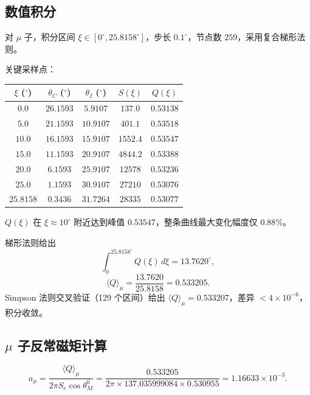 \documentclass[12pt,a4paper]{article}
\theoremstyle{definition}
\begin{document}
\subsection{数值积分}

对 $\mu$ 子，积分区间 $\xi\in[0^\circ,25.8158^\circ]$，步长 $0.1^\circ$，节点数 $259$，采用复合梯形法则。

关键采样点：

\begin{center}
\begin{tabular}{@{}ccccc@{}}
\toprule
$\xi$ ($^\circ$) & $\theta_C$ ($^\circ$) & $\theta_I$ ($^\circ$) & $S(\xi)$ & $Q(\xi)$ \\
\midrule
$0.0$ & $26.1593$ & $5.9107$ & $137.0$ & $0.53138$ \\
$5.0$ & $21.1593$ & $10.9107$ & $401.1$ & $0.53518$ \\
$10.0$ & $16.1593$ & $15.9107$ & $1552.4$ & $0.53547$ \\
$15.0$ & $11.1593$ & $20.9107$ & $4844.2$ & $0.53388$ \\
$20.0$ & $6.1593$ & $25.9107$ & $12578$ & $0.53236$ \\
$25.0$ & $1.1593$ & $30.9107$ & $27210$ & $0.53076$ \\
$25.8158$ & $0.3436$ & $31.7264$ & $28335$ & $0.53077$ \\
\bottomrule
\end{tabular}
\end{center}

$Q(\xi)$ 在 $\xi\approx10^\circ$ 附近达到峰值 $0.53547$，整条曲线最大变化幅度仅 $0.88\%$。

梯形法则给出
\begin{equation}
\int_0^{25.8158^\circ}Q(\xi)\,d\xi=13.7620^\circ,
\end{equation}
\begin{equation}
\boxed{\langle Q\rangle_\mu=\frac{13.7620}{25.8158}=0.533205.}
\end{equation}
Simpson 法则交叉验证（129 个区间）给出 $\langle Q\rangle_\mu=0.533207$，差异 $<4\times10^{-6}$，积分收敛。

\subsection{$\mu$ 子反常磁矩计算}

\begin{equation}
a_\mu=\frac{\langle Q\rangle_\mu}{2\pi S_e\cos\theta_M^0}=\frac{0.533205}{2\pi\times137.035999084\times0.530955}=1.16633\times10^{-3}.
\end{equation}
\end{document}
